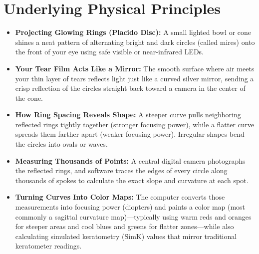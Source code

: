 \section{Underlying Physical Principles}
\begin{itemize}
    \item \textbf{Projecting Glowing Rings (Placido Disc):} A small lighted bowl or cone shines a neat pattern of alternating bright and dark circles (called mires) onto the front of your eye using safe visible or near-infrared LEDs.
    \item \textbf{Your Tear Film Acts Like a Mirror:} The smooth surface where air meets your thin layer of tears reflects light just like a curved silver mirror, sending a crisp reflection of the circles straight back toward a camera in the center of the cone.
    \item \textbf{How Ring Spacing Reveals Shape:} A steeper curve pulls neighboring reflected rings tightly together (stronger focusing power), while a flatter curve spreads them farther apart (weaker focusing power). Irregular shapes bend the circles into ovals or waves.
    \item \textbf{Measuring Thousands of Points:} A central digital camera photographs the reflected rings, and software traces the edges of every circle along thousands of spokes to calculate the exact slope and curvature at each spot.
    \item \textbf{Turning Curves Into Color Maps:} The computer converts those measurements into focusing power (diopters) and paints a color map (most commonly a sagittal curvature map)---typically using warm reds and oranges for steeper areas and cool blues and greens for flatter zones---while also calculating simulated keratometry (SimK) values that mirror traditional keratometer readings.
\end{itemize}

